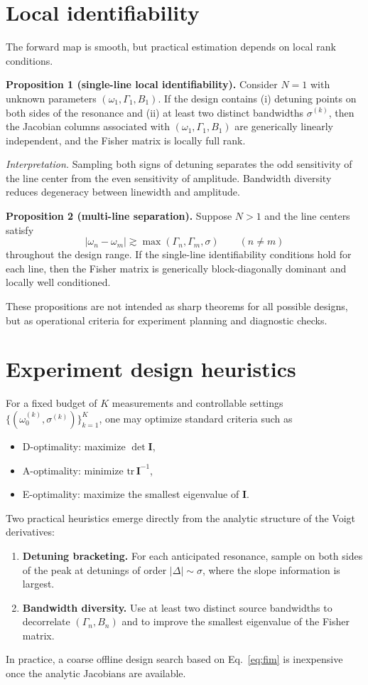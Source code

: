 \documentclass[aps,pre,amsmath,amssymb]{revtex4-2}
\begin{document}
\section{Local identifiability}
The forward map is smooth, but practical estimation depends on local rank conditions.

\textbf{Proposition 1 (single-line local identifiability).} Consider $N=1$ with unknown parameters $(\omega_1,\Gamma_1,B_1)$. If the design contains (i) detuning points on both sides of the resonance and (ii) at least two distinct bandwidths $\sigma^{(k)}$, then the Jacobian columns associated with $(\omega_1,\Gamma_1,B_1)$ are generically linearly independent, and the Fisher matrix is locally full rank.

\emph{Interpretation.} Sampling both signs of detuning separates the odd sensitivity of the line center from the even sensitivity of amplitude. Bandwidth diversity reduces degeneracy between linewidth and amplitude.

\textbf{Proposition 2 (multi-line separation).} Suppose $N>1$ and the line centers satisfy
\begin{equation}
|\omega_n-\omega_m|\gtrsim \max(\Gamma_n,\Gamma_m,\sigma)
\qquad (n\neq m)
\label{eq:sep}
\end{equation}
throughout the design range. If the single-line identifiability conditions hold for each line, then the Fisher matrix is generically block-diagonally dominant and locally well conditioned.

These propositions are not intended as sharp theorems for all possible designs, but as operational criteria for experiment planning and diagnostic checks.

\section{Experiment design heuristics}
For a fixed budget of $K$ measurements and controllable settings $\{(\omega_0^{(k)},\sigma^{(k)})\}_{k=1}^{K}$, one may optimize standard criteria such as
\begin{itemize}
\item D-optimality: maximize $\det\mathbf I$,
\item A-optimality: minimize $\mathrm{tr}\,\mathbf I^{-1}$,
\item E-optimality: maximize the smallest eigenvalue of $\mathbf I$.
\end{itemize}
Two practical heuristics emerge directly from the analytic structure of the Voigt derivatives:
\begin{enumerate}
\item \textbf{Detuning bracketing.} For each anticipated resonance, sample on both sides of the peak at detunings of order $|\Delta|\sim \sigma$, where the slope information is largest.
\item \textbf{Bandwidth diversity.} Use at least two distinct source bandwidths to decorrelate $(\Gamma_n,B_n)$ and to improve the smallest eigenvalue of the Fisher matrix.
\end{enumerate}
In practice, a coarse offline design search based on Eq.~\eqref{eq:fim} is inexpensive once the analytic Jacobians are available.
\end{document}
